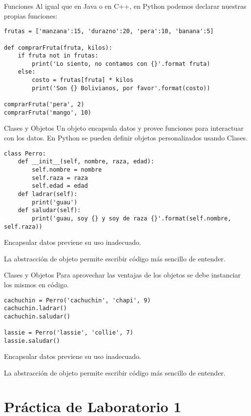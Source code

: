 \documentclass[10pt]{beamer}
\begin{document}
\begin{frame}[fragile]{Funciones}
Al igual que en Java o en C++, en Python podemos declarar nuestras propias 
funciones:
\begin{lstlisting}
frutas = ['manzana':15, 'durazno':20, 'pera':10, 'banana':5]

def comprarFruta(fruta, kilos):
    if fruta not in frutas:
        print('Lo siento, no contamos con {}'.format fruta)
    else:
        costo = frutas[fruta] * kilos
        print('Son {} Bolivianos, por favor'.format(costo))
    
comprarFruta('pera', 2)
comprarFruta('mango', 10)
\end{lstlisting}
\end{frame}



\begin{frame}[fragile]{Clases y Objetos}
Un objeto encapsula datos y provee funciones para interactuar con los datos. En 
Python se pueden definir objetos personalizados usando Clases.
\begin{lstlisting}
class Perro:
    def __init__(self, nombre, raza, edad):
        self.nombre = nombre 
        self.raza = raza 
        self.edad = edad 
    def ladrar(self):
        print('guau')
    def saludar(self):
        print('guau, soy {} y soy de raza {}'.format(self.nombre, self.raza))
\end{lstlisting}
Encapsular datos previene su uso inadecuado. 

La abstracción de objeto permite escribir código más sencillo de entender.
\end{frame}

\begin{frame}[fragile]{Clases y Objetos}
Para aprovechar las ventajas de los objetos se debe instanciar los mismos 
en código.
\begin{lstlisting}
cachuchin = Perro('cachuchin', 'chapi', 9)
cachuchin.ladrar()
cachuchin.saludar()

lassie = Perro('lassie', 'collie', 7)
lassie.saludar()
\end{lstlisting}
Encapsular datos previene su uso inadecuado. 

La abstracción de objeto permite escribir código más sencillo de entender.
\end{frame}

\section{Práctica de Laboratorio 1}
\end{document}
